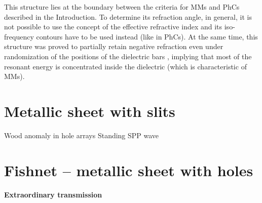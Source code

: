 This structure lies at the boundary between the criteria for MMs and PhCs described in the Introduction.  To determine its refraction angle, in general, it is not possible to use the concept of the effective refractive index and its iso-frequency contours have to be used instead (like in PhCs). At the same time, this structure was proved to partially retain negative refraction even under randomization of the positions of the dielectric bars \cite{peng2007}, implying that most of the resonant energy is concentrated inside the dielectric (which is characteristic of MMs).








\FloatBarrier %
\section{Metallic sheet with slits} \label{section_eot} %
Wood anomaly in hole arrays
Standing SPP wave

\FloatBarrier %
\section{Fishnet -- metallic sheet with holes} \label{section_fishnet} %
\paragraph{Extraordinary transmission}

